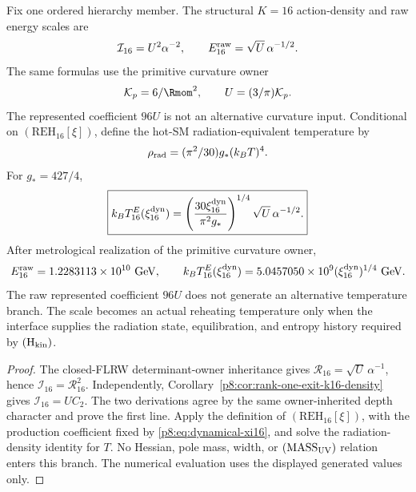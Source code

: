 \documentclass[12pt,a4paper]{article}
\begin{document}
\begin{theorem}[Hierarchy-covariant direct \(K=16\) radiation-equivalent scale]
\label{p8:thm:direct-k16-radiation-equivalent-scale}
Fix one ordered hierarchy member.  The structural \(K=16\) action-density and raw energy scales are
\[
 \mathcal I_{16}=U^2\alpha^{-2},\qquad
 E_{16}^{\rm raw}=\sqrt U\,\alpha^{-1/2}.
\]
The same formulas use the primitive curvature owner
\[
 \mathcal K_p=6/\Rmom^2,\qquad U=(3/\pi)\mathcal K_p.
\]
The represented coefficient \(96U\) is not an alternative curvature input.
Conditional on \((\mathrm{REH}_{16}[\xi])\), define the hot-SM
radiation-equivalent temperature by
\[
 \rho_{\rm rad}=(\pi^2/30)g_*(k_BT)^4.
\]
For \(g_*=427/4\),
\[
 \boxed{k_BT_{16}^{E}(\xi_{16}^{\rm dyn})
 =\left(\frac{30\xi_{16}^{\rm dyn}}{\pi^2g_*}\right)^{1/4}
 \sqrt U\,\alpha^{-1/2}.}
\]
After metrological realization of the primitive curvature owner,
\[
 E_{16}^{\rm raw}=1.2283113\times10^{10}\ {\rm GeV},\qquad
 k_BT_{16}^{E}(\xi_{16}^{\rm dyn})
 =5.0457050\times10^9(\xi_{16}^{\rm dyn})^{1/4}\ {\rm GeV}.
\]
The raw represented coefficient \(96U\) does not generate an alternative temperature branch.  The scale becomes an actual reheating temperature only when the interface supplies the radiation state, equilibration, and entropy history required by \((\mathrm H_{\rm kin})\).
\end{theorem}

\begin{proof}
The closed-FLRW determinant-owner inheritance gives
\(\mathcal R_{16}=\sqrt U\,\alpha^{-1}\), hence
\(\mathcal I_{16}=\mathcal R_{16}^2\).  Independently,
Corollary~\ref{p8:cor:rank-one-exit-k16-density} gives
\(\mathcal I_{16}=U C_2\).  The two derivations agree by the
same owner-inherited depth character and prove the first line.  Apply the
definition of \((\mathrm{REH}_{16}[\xi])\), with the production coefficient
fixed by \eqref{p8:eq:dynamical-xi16}, and solve the radiation-density
identity for \(T\).  No Hessian, pole mass, width, or
\((\mathrm{MASS}_{\rm UV})\) relation enters this branch.  The numerical
evaluation uses the displayed generated values only.
\end{proof}
\end{document}
